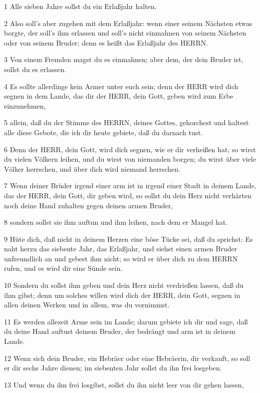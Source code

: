 \par 1 Alle sieben Jahre sollst du ein Erlaßjahr halten.
\par 2 Also soll's aber zugehen mit dem Erlaßjahr: wenn einer seinem Nächsten etwas borgte, der soll's ihm erlassen und soll's nicht einmahnen von seinem Nächsten oder von seinem Bruder; denn es heißt das Erlaßjahr des HERRN.
\par 3 Von einem Fremden magst du es einmahnen; aber dem, der dein Bruder ist, sollst du es erlassen.
\par 4 Es sollte allerdinge kein Armer unter euch sein; denn der HERR wird dich segnen in dem Lande, das dir der HERR, dein Gott, geben wird zum Erbe einzunehmen,
\par 5 allein, daß du der Stimme des HERRN, deines Gottes, gehorchest und haltest alle diese Gebote, die ich dir heute gebiete, daß du darnach tust.
\par 6 Denn der HERR, dein Gott, wird dich segnen, wie er dir verheißen hat; so wirst du vielen Völkern leihen, und du wirst von niemanden borgen; du wirst über viele Völker herrschen, und über dich wird niemand herrschen.
\par 7 Wenn deiner Brüder irgend einer arm ist in irgend einer Stadt in deinem Lande, das der HERR, dein Gott, dir geben wird, so sollst du dein Herz nicht verhärten noch deine Hand zuhalten gegen deinen armen Bruder,
\par 8 sondern sollst sie ihm auftun und ihm leihen, nach dem er Mangel hat.
\par 9 Hüte dich, daß nicht in deinem Herzen eine böse Tücke sei, daß du sprichst: Es naht herzu das siebente Jahr, das Erlaßjahr, und siehst einen armen Bruder unfreundlich an und gebest ihm nicht; so wird er über dich zu dem HERRN rufen, und es wird dir eine Sünde sein.
\par 10 Sondern du sollst ihm geben und dein Herz nicht verdrießen lassen, daß du ihm gibst; denn um solches willen wird dich der HERR, dein Gott, segnen in allen deinen Werken und in allem, was du vornimmst.
\par 11 Es werden allezeit Arme sein im Lande; darum gebiete ich dir und sage, daß du deine Hand auftust deinem Bruder, der bedrängt und arm ist in deinem Lande.
\par 12 Wenn sich dein Bruder, ein Hebräer oder eine Hebräerin, dir verkauft, so soll er dir sechs Jahre dienen; im siebenten Jahr sollst du ihn frei losgeben.
\par 13 Und wenn du ihn frei losgibst, sollst du ihn nicht leer von dir gehen lassen,

